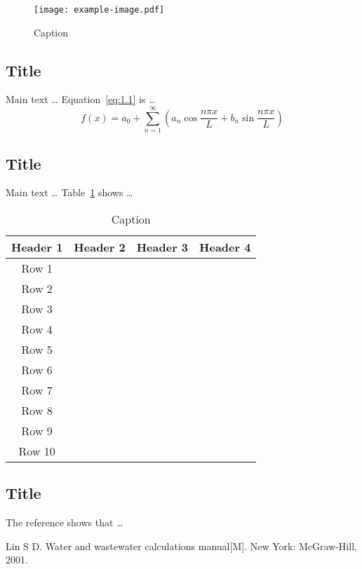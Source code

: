 \documentclass[degree=doctor,language=english]{thuthesis}
\begin{document}
\begin{figure}
  \centering
  \texttt{[image: example-image.pdf]}
  \caption{Caption}
  \label{fig:1.1}
\end{figure}

\subsection{Title}

Main text … Equation~\eqref{eq:1.1} is …
\begin{equation}
  f(x) = a_0 + \sum_{n=1}^\infty \left( a_n \cos⁡ \frac{n \pi x}{L}
    + b_n \sin⁡ \frac{n \pi x}{L} \right)
  \label{eq:1.1}
\end{equation}

\subsection{Title}

Main text … Table~\ref{tab:1.1} shows …

\begin{table}
  \centering
  \caption{Caption}
  \label{tab:1.1}
  \begin{tabular}{cccc}
    \toprule
    Header 1 & Header 2 & Header 3 & Header 4 \\
    \midrule
    Row 1 &  &  & \\
    Row 2 &  &  & \\
    Row 3 &  &  & \\
    Row 4 &  &  & \\
    Row 5 &  &  & \\
    Row 6 &  &  & \\
    Row 7 &  &  & \\
    Row 8 &  &  & \\
    Row 9 &  &  & \\
    Row 10 &  &  & \\
    \bottomrule
  \end{tabular}
\end{table}

\subsection{Title}

The reference\cite{bib1} shows that \dots


\backmatter

% 

\begin{thebibliography}{9}
   Lin S D. Water and wastewater calculations manual[M]. New York: McGraw-Hill, 2001.

\end{thebibliography}
\end{document}
